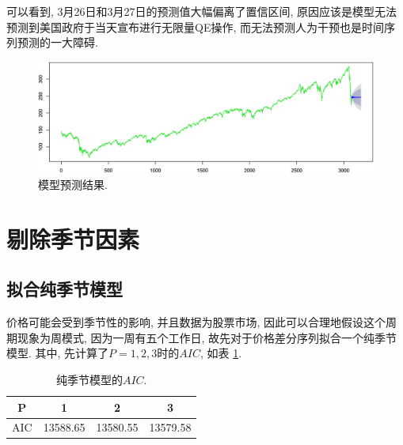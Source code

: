 \documentclass[12pt]{article}
\begin{document}
可以看到, 3月26日和3月27日的预测值大幅偏离了置信区间, 原因应该是模型无法预测到美国政府于当天宣布进行无限量QE操作, 而无法预测人为干预也是时间序列预测的一大障碍. 
\begin{figure}
    \centering
    \includegraphics[width=.7\textwidth]{f}
    \caption{模型预测结果. \label{fig:7}}
\end{figure}







\section{剔除季节因素}
\subsection{拟合纯季节模型}
\qquad 价格可能会受到季节性的影响, 并且数据为股票市场, 因此可以合理地假设这个周期现象为周模式, 因为一周有五个工作日, 故先对于价格差分序列拟合一个纯季节模型. 其中, 先计算了$P=1,2,3$时的$AIC$, 如表 \ref{tab:my-table3}. 
\begin{table}[htbp]
    \centering
    \caption{纯季节模型的$AIC$.}
    \label{tab:my-table3}
    \begin{tabular}{c|ccc}
    \hline
    P   & 1        & 2        & 3        \\ \hline
    AIC & 13588.65 & 13580.55 & 13579.58 \\ \hline
    \end{tabular}
\end{table}
\end{document}
